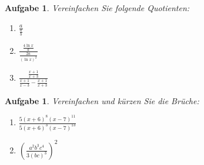 \documentclass[12pt]{article}
\newtheorem{exercise}[satz]{Aufgabe}
\begin{document}
 \vspace{0.2cm}

   \begin{exercise}
  Vereinfachen Sie folgende Quotienten:
  \begin{multicols}{2}
  \begin{enumerate}
  \item[(a)] $\frac{a}{\frac{a}{b}}$
  \item[(b)] $\frac{\frac{4 \ln{x}}{a}}{\frac{2a}{(\ln{x})^2}}$
  \item[(c)] $\frac{\frac{x+1}{x+3}}{\frac{x+1}{x-3}-\frac{x+1}{x+3}}$
  \end{enumerate}
  \end{multicols}
   \end{exercise}

    \vspace{0.2cm}

    \begin{exercise}
  Vereinfachen und k\"urzen Sie die Br\"uche:
  \begin{enumerate}
  \item[(a)] $\frac{5(x+6)^8 (x-7)^{11}}{5(x+6)^3 (x-7)^{13}}$
  \item[(b)] $(\frac{a^2b^3c^4}{3(bc)^3})^2$
  \end{enumerate}
   \end{exercise}
   
 
   
   
\end{document}
